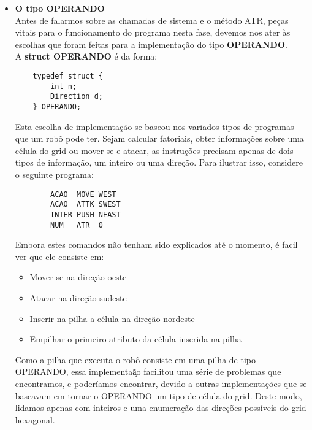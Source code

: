 \documentclass{article}
\begin{document}
\begin{itemize}
\begin{lstlisting}
    \end{lstlisting}
    Nada mais que um \textit{loop} que percorre o vetor de rob\^os da Arena e executa as instru\c c\~oes fornecidas ao rob\^o um n\'umero \textit{ciclos} de vezes, aumentando o tempo de jogo em 1 a cada atualiza\c c\~ao.\\
    Dessa forma, o \textit{game loop} \'e formado por uma s\'erie de chamadas desta fun\c c\~ao, utilizadas at\'e que um dos times saia vencedor.
    
    \item \textbf{O tipo OPERANDO} \\
    Antes de falarmos sobre as chamadas de sistema e o m\'etodo ATR, pe\c cas vitais para o funcionamento do programa nesta fase, devemos nos ater \`as escolhas que foram feitas para a implementa\c c\~ao do tipo \textbf{OPERANDO}. \\
    A \textbf{struct OPERANDO} \'e da forma: 
    \begin{lstlisting}
    typedef struct {
        int n;
        Direction d;
    } OPERANDO;
    \end{lstlisting}
    Esta escolha de implementa\c c\~ao se baseou nos variados tipos de programas que um rob\^o pode ter. Sejam calcular fatoriais, obter informa\c c\~oes sobre uma c\'elula do grid ou mover-se e atacar, as instru\c c\~oes precisam apenas de dois tipos de informa\c c\~ao, um inteiro ou uma dire\c c\~ao. Para ilustrar isso, considere o seguinte programa:
    \begin{lstlisting}
        ACAO  MOVE WEST
        ACAO  ATTK SWEST
        INTER PUSH NEAST
        NUM   ATR  0
    \end{lstlisting}
    Embora estes comandos n\~ao tenham sido explicados at\'e o momento, \'e facil ver que ele consiste em:
    \begin{itemize}
        \item Mover-se na dire\c c\~ao oeste
        \item Atacar na dire\c c\~ao sudeste
        \item Inserir na pilha a c\'elula na dire\c c\~ao nordeste
        \item Empilhar o primeiro atributo da c\'elula inserida na pilha
    \end{itemize}
    Como a pilha que executa o rob\^o consiste em uma pilha de tipo OPERANDO, essa implementa\c \~ao facilitou uma s\'erie de problemas que encontramos, e poder\'iamos encontrar, devido a outras implementa\c c\~oes que se baseavam em tornar o OPERANDO um tipo de c\'elula do grid. Deste modo, lidamos apenas com inteiros e uma enumera\c c\~ao das dire\c c\~oes poss\'iveis do grid hexagonal.
    

\end{itemize}
\end{document}
